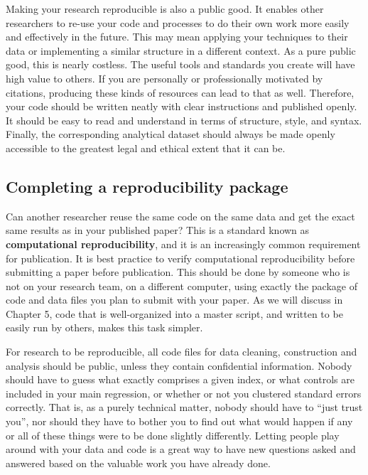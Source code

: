 Making your research reproducible is also a public good.
It enables other researchers to re-use your code and processes
to do their own work more easily and effectively in the future.
This may mean applying your techniques to their data
or implementing a similar structure in a different context.
As a pure public good, this is nearly costless.
The useful tools and standards you create will have high value to others.
If you are personally or professionally motivated by citations,
producing these kinds of resources can lead to that as well.
Therefore, your code should be written neatly with clear instructions and published openly.
It should be easy to read and understand in terms of structure, style, and syntax.
Finally, the corresponding analytical dataset should always be made openly accessible
to the greatest legal and ethical extent that it can be.

\subsection{Completing a reproducibility package}
Can another researcher reuse the same code on the same data
and get the exact same results as in your published paper?
This is a standard known as \textbf{computational reproducibility},
and it is an increasingly common requirement for publication.
It is best practice to verify computational reproducibility before submitting a paper before publication.
This should be done by someone who is not on your research team, on a different computer,
using exactly the package of code and data files you plan to submit with your paper.
As we will discuss in Chapter 5,
code that is well-organized into a master script, and written to be easily run by others,
makes this task simpler.

For research to be reproducible,
all code files for data cleaning, construction and analysis
should be public, unless they contain confidential information.
Nobody should have to guess what exactly comprises a given index,
or what controls are included in your main regression,
or whether or not you clustered standard errors correctly.
That is, as a purely technical matter, nobody should have to ``just trust you'',
nor should they have to bother you to find out what would happen
if any or all of these things were to be done slightly differently.\cite{simmons2011false,simonsohn2015specification,wicherts2016degrees}
Letting people play around with your data and code
is a great way to have new questions asked and answered
based on the valuable work you have already done.

